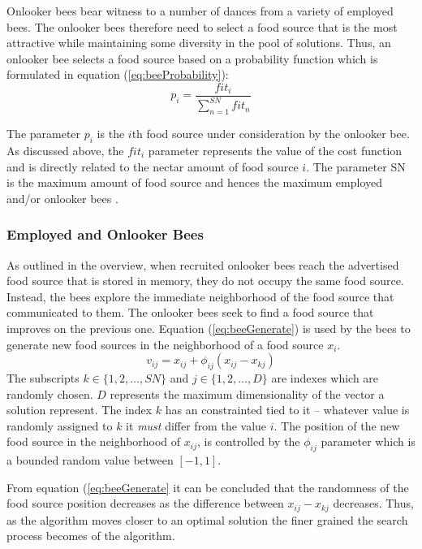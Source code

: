 Onlooker bees bear witness to a number of dances from a variety of employed bees. The onlooker bees therefore need to select a food source that is the most attractive while maintaining some diversity in the pool of solutions. Thus, an onlooker bee selects a food source based on a probability function which is formulated in equation (\ref{eq:beeProbability})\cite{ABCCompareStudy}:
\begin{equation}
\label{eq:beeProbability}
p_i = \frac{{fit}_i}{\sum^{SN}_{n=1}{fit}_n}
\end{equation}

The parameter $p_i$ is the $i$th food source under consideration by the onlooker bee. As discussed above, the ${fit}_i$ parameter represents the value of the cost function and is directly related to the nectar amount of food source $i$. The parameter SN is the maximum amount of food source and hences the maximum employed and/or onlooker bees \cite{ABCCompareStudy}.

\subsubsection{Employed and Onlooker Bees}
As outlined in the overview, when recruited onlooker bees reach the advertised food source that is stored in memory, they do not occupy the same food source. Instead, the bees explore the immediate neighborhood of the food source that communicated to them. The onlooker bees seek to find a food source that improves on the previous one. Equation (\ref{eq:beeGenerate}) is used by the bees to generate new food sources in the neighborhood of a food source $x_i$.
\begin{equation}
\label{eq:beeGenerate}
v_{ij} = x_{ij} + \phi_{ij}(x_{ij} - x_{kj})
\end{equation}
The subscripts $k \in \{1,2,\dots,SN\}$ and $j \in \{1,2,\dots,D\}$ are indexes which are randomly chosen. $D$ represents the maximum dimensionality of the vector a solution represent. The index $k$ has an constrainted tied to it -- whatever value is randomly assigned to $k$ it \emph{must} differ from the value $i$. The position of the new food source in the neighborhood of $x_{ij}$, is controlled by the $\phi_{ij}$ parameter which is a bounded random value between $[-1,1]$. 

From equation (\ref{eq:beeGenerate} it can be concluded that the randomness of the food source position decreases as the difference between $x_{ij} - x_{kj}$ decreases. Thus, as the algorithm moves closer to an optimal solution the finer grained the search process becomes of the algorithm.

